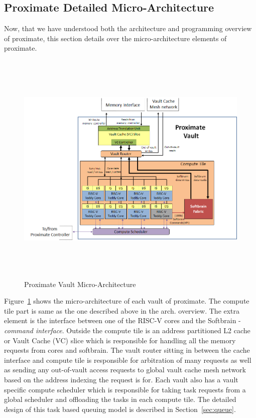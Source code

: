 \subsection{Proximate Detailed Micro-Architecture}
Now, that we have understood both the architecture and programming overview of
proximate, this section details over the micro-architecture elements of proximate. 


\begin{figure}
  \begin{center}
    \includegraphics[width=\linewidth, height=4.5in]{cs758-figs/vault.png}
  \end{center}
\vspace{-0.2in}
  \caption{Proximate Vault Micro-Architecture}
  \label{fig:vault}
\vspace{-0.05in}
\end{figure}

Figure~\ref{fig:vault} shows the micro-architecture of each vault of proximate.
The compute tile part is same as the one described above in the arch. overview. The extra element is
the interface between one of the RISC-V cores and the Softbrain - \emph{command interface}.
Outside the compute tile is an address partitioned L2 cache or Vault Cache (VC) slice which is responsible
for handling all the memory requests from cores and softbrain. The vault router sitting in between the 
cache interface and compute tile is responsible for arbitration of many requests as well as
sending any out-of-vault access requests to global vault cache mesh network based on the address indexing the request is for.
Each vault also has a vault specific compute scheduler which is responsible for taking task requests from a global scheduler 
and offloading the tasks in each compute tile. The detailed design of this task based queuing model is described in Section~\ref{sec:queue}.


